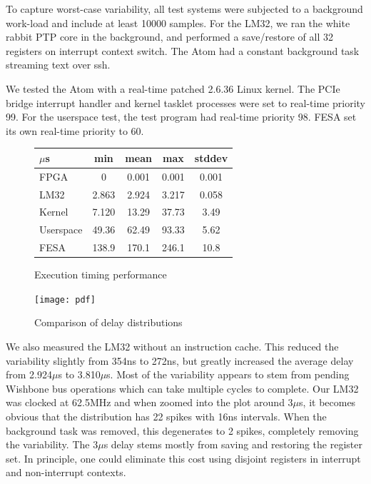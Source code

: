 \documentclass{JAC2003}
\begin{document}
To capture worst-case variability, 
all test systems were subjected to a background work-load
and include at least 10000 samples.
For the LM32, 
we ran the white rabbit PTP core in the background,
and performed a save/restore of all 32 registers on interrupt context switch.
The Atom had a constant background task streaming text over ssh.

We tested the Atom with a real-time patched 2.6.36 Linux kernel.
The PCIe bridge interrupt handler and kernel tasklet processes were set to
real-time priority 99.
For the userspace test, the test program had real-time priority 98.
FESA set its own real-time priority to 60.

\begin{figure}[t]
   \centering
   \begin{tabular}{l|c|c|c|c}
     $\mu$s    & min   & mean  & max   & stddev \\
     \hline
     FPGA      & 0 & 0.001 & 0.001 & 0.001 \\
     LM32      & 2.863 & 2.924 & 3.217 & 0.058  \\
     Kernel    & 7.120 & 13.29 & 37.73 & 3.49   \\
     Userspace & 49.36 & 62.49 & 93.33 & 5.62   \\
     FESA      & 138.9 & 170.1 & 246.1 & 10.8 \\
   \end{tabular}
   \caption{Execution timing performance}
\end{figure}


\begin{figure}[t]
   \centering
   \texttt{[image: pdf]}
   \caption{Comparison of delay distributions}
\end{figure}

We also measured the LM32 without an instruction cache.
This reduced the variability slightly from 354ns to 272ns, 
but greatly increased the average delay from 2.924$\mu$s to 3.810$\mu$s.
Most of the variability appears to stem from pending Wishbone bus operations which
can take multiple cycles to complete.
Our LM32 was clocked at 62.5MHz and when zoomed into the plot around 3$\mu$s,
it becomes obvious that the distribution has 22 spikes with 16ns intervals.
When the background task was removed, 
this degenerates to 2 spikes, 
completely removing the variability.
The 3$\mu$s delay stems mostly from saving and restoring the register set.
In principle, one could eliminate this cost using disjoint registers 
in interrupt and non-interrupt contexts.
\end{document}
